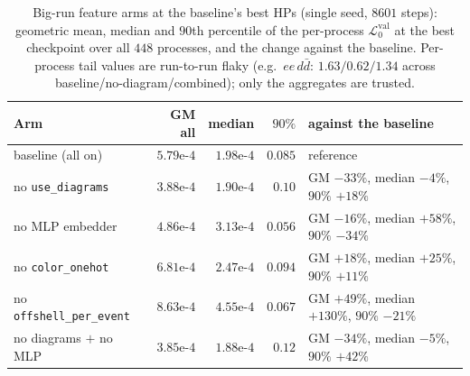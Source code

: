 \documentclass[11pt]{article}
\newcommand{\vlnr}{\mathcal{L}^{\mathrm{val}}_{0}}   %
\newcommand{\code}[1]{\texttt{#1}}
\begin{document}
\begin{table}[H]
\centering
\caption{Big-run feature arms at the baseline's best HPs (single seed, $8601$ steps): geometric
mean, median and $90$th percentile of the per-process $\vlnr$ at the best checkpoint over all
$448$ processes, and the change against the baseline. Per-process tail values are run-to-run
flaky (e.g.\ $ee\,d\bar d$: $1.63/0.62/1.34$ across baseline/no-diagram/combined); only the
aggregates are trusted.}
\label{tab:bigrun_arms}
\begin{tabular}{@{}lrrrl@{}}
\toprule
Arm & GM all & median & $90\%$ & against the baseline \\
\midrule
baseline (all on)            & $5.79\text{e-}4$ & $1.98\text{e-}4$ & $0.085$ & reference \\
no \code{use\_diagrams}      & $3.88\text{e-}4$ & $1.90\text{e-}4$ & $0.10$ & GM $-33\%$, median $-4\%$, $90\%$ $+18\%$ \\
no MLP embedder              & $4.86\text{e-}4$ & $3.13\text{e-}4$ & $0.056$ & GM $-16\%$, median $+58\%$, $90\%$ $-34\%$ \\
no \code{color\_onehot}      & $6.81\text{e-}4$ & $2.47\text{e-}4$ & $0.094$ & GM $+18\%$, median $+25\%$, $90\%$ $+11\%$ \\
no \code{offshell\_per\_event} & $8.63\text{e-}4$ & $4.55\text{e-}4$ & $0.067$ & GM $+49\%$, median $+130\%$, $90\%$ $-21\%$ \\
no diagrams $+$ no MLP       & $3.85\text{e-}4$ & $1.88\text{e-}4$ & $0.12$ & GM $-34\%$, median $-5\%$, $90\%$ $+42\%$ \\
\bottomrule
\end{tabular}
\end{table}
\end{document}
